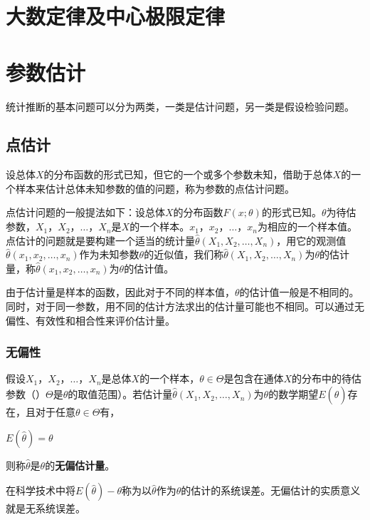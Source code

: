 \documentclass[11pt]{book}
\newcounter{#2}
\newcounter{#2}[#1]
\numberwithin{#2}{#1}
\begin{document}
		
		
		
		
	
	
	
	\chapter{大数定律及中心极限定律}
	
	
	\chapter{参数估计}
	统计推断的基本问题可以分为两类，一类是估计问题，另一类是假设检验问题。
	\section{点估计}
	\begin{newdef}
		设总体$X$的分布函数的形式已知，但它的一个或多个参数未知，借助于总体$X$的一个样本来估计总体未知参数的值的问题，称为参数的点估计问题。
	\end{newdef}
点估计问题的一般提法如下：设总体$X$的分布函数$F(x;\theta)$的形式已知。$\theta$为待估参数，$X_1$，$X_2$，$\dots$，$X_n$是$X$的一个样本。$x_1$，$x_2$，$\dots$，$x_n$为相应的一个样本值。点估计的问题就是要构建一个适当的统计量$\hat{\theta}(X_1,X_2,\dots,X_n)$，用它的观测值$\hat{\theta}(x_1,x_2,\dots,x_n)$作为未知参数$\theta$的近似值，我们称$\hat{\theta}(X_1,X_2,\dots,X_n)$为$\theta$的估计量，称$\hat{\theta}(x_1,x_2,\dots,x_n)$为$\theta$的估计值。

由于估计量是样本的函数，因此对于不同的样本值，$\theta$的估计值一般是不相同的。同时，对于同一参数，用不同的估计方法求出的估计量可能也不相同。可以通过无偏性、有效性和相合性来评价估计量。
\subsection{无偏性}
\begin{newdef}
	假设$X_1$，$X_2$，$\dots$，$X_n$是总体$X$的一个样本，$\theta\in\Theta$是包含在通体$X$的分布中的待估参数（）$\Theta$是$\theta$的取值范围）。若估计量$\hat{\theta}(X_1,X_2,\dots,X_n)$为$\theta$的数学期望$E(\hat{\theta})$存在，且对于任意$\theta\in\Theta$有，
	\begin{center}
		$E(\hat{\theta})=\theta$
	\end{center}
则称$\hat{\theta}$是$\theta$的\textbf{无偏估计量}。
\end{newdef}

在科学技术中将$E(\hat{\theta})-\theta$称为以$\hat{\theta}$作为$\theta$的估计的系统误差。无偏估计的实质意义就是无系统误差。
\end{document}
